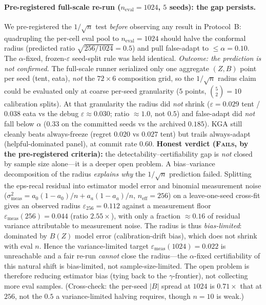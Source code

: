 \documentclass[conference]{IEEEtran}
\theoremstyle{plain}
\theoremstyle{definition}
\begin{document}
\paragraph{Pre-registered full-scale re-run ($n_{\mathrm{eval}}{=}1024$, $5$ seeds): the gap
persists.} We pre-registered the $1/\sqrt{n}$ test \emph{before} observing any result
in Protocol~B: quadrupling the per-cell eval
pool to $n_{\mathrm{eval}}{=}1024$ should halve the conformal radius (predicted ratio
$\sqrt{256/1024}{=}0.5$) and pull false-adapt to $\le\alpha{=}0.10$. The $\alpha$-fixed, frozen-$\varepsilon$
seed-split rule was held identical. \emph{Outcome: the prediction is not confirmed.} The full-scale
runner serialized only one aggregate $(Z,B)$ point per seed (tent, eata), \emph{not} the $72{\times}6$
composition grid, so the $1/\sqrt{n}$ radius claim could be evaluated only at coarse per-seed
granularity ($5$ points, $\binom{5}{2}{=}10$ calibration splits). At that granularity the radius did
\emph{not} shrink ($\varepsilon{=}0.029$ tent / $0.038$ eata vs the debug $\varepsilon{\approx}0.030$;
ratio $\approx\!1.0$, not $0.5$) and false-adapt did \emph{not} fall below $\alpha$ ($0.33$ on the
committed seeds vs the archived $0.185$). \textsc{KGA} still cleanly beats always-freeze (regret
$0.020$ vs $0.027$ tent) but trails always-adapt (helpful-dominated panel), at commit rate $0.60$.
\textbf{Honest verdict (\textsc{Fails}, by the pre-registered criteria):} the
detectability--certifiability gap is \emph{not} closed by sample size alone---it is a deeper open
problem. A bias--variance decomposition of the radius \emph{explains why} the $1/\sqrt{n}$ prediction
failed. Splitting the eps-recal residual into estimator model error and
binomial measurement noise ($\sigma^2_{\mathrm{meas}}{=}a_0(1{-}a_0)/n{+}a_a(1{-}a_a)/n$,
$n_{\mathrm{eff}}{=}256$) on a leave-one-seed cross-fit gives an observed radius
$\varepsilon_{256}{=}0.112$ against a measurement floor $\varepsilon_{\mathrm{meas}}(256){=}0.044$
(ratio $2.55\times$), with only a fraction $\approx0.16$ of residual variance attributable to
measurement noise. The radius is thus \emph{bias-limited}: dominated by $\widehat{B}(Z)$ model error
(calibration-drift bias), which does not shrink with eval $n$. Hence the variance-limited target
$\varepsilon_{\mathrm{meas}}(1024){=}0.022$ is unreachable and a fair re-run \emph{cannot} close the
radius---the $\alpha$-fixed certifiability of this natural shift is bias-limited, not
sample-size-limited. The open problem is therefore reducing estimator bias (tying back to the
$\gamma$-frontier), not collecting more eval samples. (Cross-check: the per-seed $|B|$ spread at $1024$
is $0.71\times$ that at $256$, not the $0.5$ a variance-limited halving requires, though $n{=}10$ is
weak.)
\end{document}
